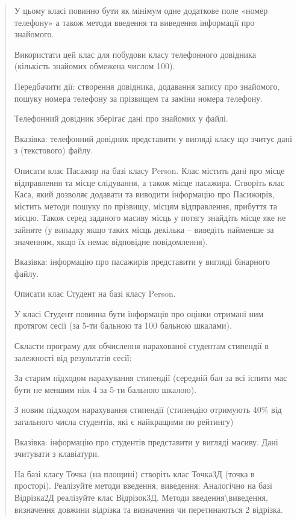 \documentclass[]{article}
\begin{document}
\begin{quote}
У цьому класі повинно бути як мінімум одне додаткове поле «номер
телефону» а також методи введення та виведення інформації про знайомого.

Використати цей клас для побудови класу телефонного довідника (кількість
знайомих обмежена числом 100).

Передбачити дії: створення довідника, додавання запису про знайомого,
пошуку номера телефону за прізвищем та заміни номера телефону.

Телефонний довідник зберігає дані про знайомих у файлі.

Вказівка: телефонний довідник представити у вигляді класу що зчитує дані
з (текстового) файлу.

\protect\hypertarget{_Hlk65951527}{}{}

Описати клас Пасажир на базі класу Person. Клас містить дані про місце
відправлення та місце слідування, а також місце пасажира. Створіть клас
Каса, який дозволяє додавати та виводити інформацію про Пасижирів,
містить методи пошуку по прізвищу, місцям відправлення, прибуття та
місцю. Також серед заданого масиву місць у потягу знайдіть місце яке не
зайняте (у випадку якщо таких місць декілька -- виведіть найменше за
значенням, якщо їх немає відповідне повідомлення).

Вказівка: інформацію про пасажирів представити у вигляді бінарного
файлу.

Описати клас Студент на базі класу Person.

У класі Студент повинна бути інформація про оцінки отримані ним протягом
сесії (за 5-ти бальною та 100 бальною шкалами).

Скласти програму для обчислення нарахованої студентам стипендії в
залежності від результатів сесії:

За старим підходом нарахування стипендії (середній бал за всі іспити має
бути не меншим ніж 4 за 5-ти бальною шкалою).

З новим підходом нарахування стипендії (стипендію отримують 40\% від
загального числа студентів, які є найкращими по рейтингу)

Вказівка: інформацію про студентів представити у вигляді масиву. Дані
зчитувати з клавіатури.

\protect\hypertarget{_Hlk65951500}{}{}На базі класу Точка (на площині)
створіть клас Точка3Д (точка в просторі). Реалізуйте методи введення,
виведення. Аналогічно на базі Відрізка2Д реалізуйте клас Відрізок3Д.
Методи введення\textbackslash{}виведення, визначення довжини відрізка та
визначення чи перетинаються 2 відрізка.


\end{quote}
\end{document}
